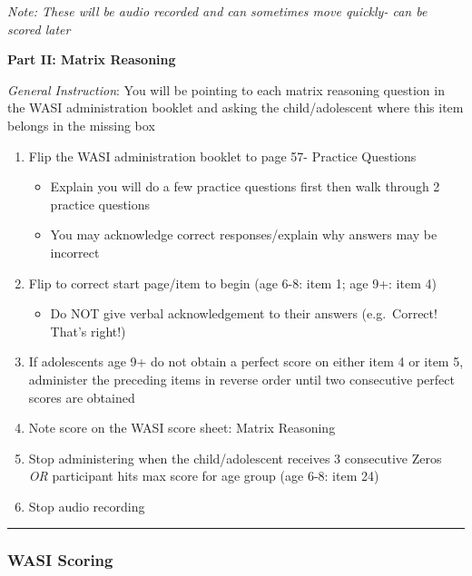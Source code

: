 \documentclass[
]{book}
\providecommand{\tightlist}{%
  \setlength{\itemsep}{0pt}\setlength{\parskip}{0pt}}
\begin{document}
\emph{Note: These will be audio recorded and can sometimes move quickly- can be scored later}

\textbf{Part II: Matrix Reasoning}

\emph{General Instruction}: You will be pointing to each matrix reasoning question in the WASI administration booklet and asking the child/adolescent where this item belongs in the missing box

\begin{enumerate}
\def\labelenumi{\arabic{enumi}.}
\tightlist
\item
  Flip the WASI administration booklet to page 57- Practice Questions

  \begin{itemize}
  \tightlist
  \item
    Explain you will do a few practice questions first then walk through 2 practice questions
  \item
    You may acknowledge correct responses/explain why answers may be incorrect
  \end{itemize}
\item
  Flip to correct start page/item to begin (age 6-8: item 1; age 9+: item 4)

  \begin{itemize}
  \tightlist
  \item
    Do NOT give verbal acknowledgement to their answers (e.g.~Correct! That's right!)
  \end{itemize}
\item
  If adolescents age 9+ do not obtain a perfect score on either item 4 or item 5, administer the preceding items in reverse order until two consecutive perfect scores are obtained
\item
  Note score on the WASI score sheet: Matrix Reasoning
\item
  Stop administering when the child/adolescent receives 3 consecutive Zeros \emph{OR} participant hits max score for age group (age 6-8: item 24)
\item
  Stop audio recording
\end{enumerate}

\begin{center}\rule{0.5\linewidth}{0.5pt}\end{center}

\hypertarget{wasi-scoring}{%
\subsubsection{WASI Scoring}\label{wasi-scoring}}
\end{document}

